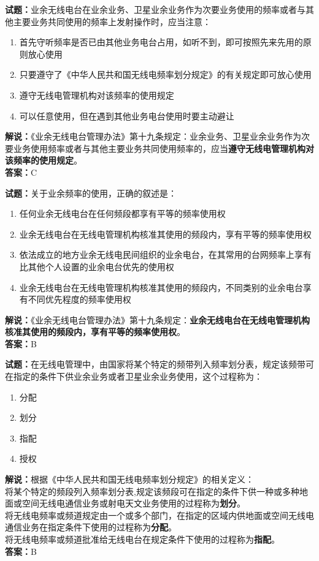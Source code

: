 \documentclass{ctexbook}
\begin{document}
\vspace{1em}

\textbf{试题：}业余无线电台在业余业务、卫星业余业务作为次要业务使用的频率或者与其他主要业务共同使用的频率上发射操作时，应当注意：
\begin{enumerate}[leftmargin=3em]
  \item 首先守听频率是否已由其他业务电台占用，如听不到，即可按照先来先用的原则放心使用
  \item 只要遵守了《中华人民共和国无线电频率划分规定》的有关规定即可放心使用
  \item 遵守无线电管理机构对该频率的使用规定
  \item 可以任意使用，但在遇到其他业务电台使用时要主动避让
\end{enumerate}
\noindent\textbf{解说：}《业余无线电台管理办法》第十九条规定：业余业务、卫星业余业务作为次要业务使用频率或者与其他主要业务共同使用频率的，应当\textbf{遵守无线电管理机构对该频率的使用规定}。\\\noindent\textbf{答案：}C

\vspace{1em}

\textbf{试题：}关于业余频率的使用，正确的叙述是：
\begin{enumerate}[leftmargin=3em]
  \item 任何业余无线电台在任何频段都享有平等的频率使用权
  \item 业余无线电台在无线电管理机构核准其使用的频段内，享有平等的频率使用权
  \item 依法成立的地方业余无线电民间组织的业余电台，在其常用的台网频率上享有比其他个人设置的业余电台优先的使用权
  \item 业余无线电台在无线电管理机构核准其使用的频段内，不同类别的业余电台享有不同优先程度的频率使用权
\end{enumerate}
\noindent\textbf{解说：}《业余无线电台管理办法》第十九条规定：\textbf{业余无线电台在无线电管理机构核准其使用的频段内，享有平等的频率使用权}。\\\noindent\textbf{答案：}B

\vspace{1em}

\textbf{试题：}在无线电管理中，由国家将某个特定的频带列入频率划分表，规定该频带可在指定的条件下供业余业务或者卫星业余业务使用，这个过程称为：
\begin{enumerate}[leftmargin=3em]
  \item 分配
  \item 划分
  \item 指配
  \item 授权
\end{enumerate}
\noindent\textbf{解说：}根据《中华人民共和国无线电频率划分规定》的相关定义：\\将某个特定的频段列入频率划分表,规定该频段可在指定的条件下供一种或多种地面或空间无线电通信业务或射电天文业务使用的过程称为\textbf{划分}。\\将无线电频率或频道规定由一个或多个部门，在指定的区域内供地面或空间无线电通信业务在指定条件下使用的过程称为\textbf{分配}。\\将无线电频率或频道批准给无线电台在规定条件下使用的过程称为\textbf{指配}。\\
\textbf{答案：}B
\end{document}
